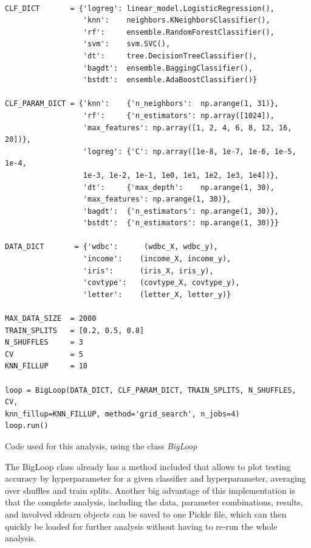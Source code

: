 \documentclass[twoside,11pt]{article}
\begin{document}
		\begin{listing}
		\begin{verbatim}

CLF_DICT       = {'logreg': linear_model.LogisticRegression(),
                  'knn':    neighbors.KNeighborsClassifier(),
                  'rf':     ensemble.RandomForestClassifier(),
                  'svm':    svm.SVC(),
                  'dt':     tree.DecisionTreeClassifier(),
                  'bagdt':  ensemble.BaggingClassifier(),
                  'bstdt':  ensemble.AdaBoostClassifier()}
                  
CLF_PARAM_DICT = {'knn':    {'n_neighbors':  np.arange(1, 31)},
                  'rf':     {'n_estimators': np.array([1024]),
                  'max_features': np.array([1, 2, 4, 6, 8, 12, 16, 20])},
                  'logreg': {'C': np.array([1e-8, 1e-7, 1e-6, 1e-5, 1e-4,
                  1e-3, 1e-2, 1e-1, 1e0, 1e1, 1e2, 1e3, 1e4])},
                  'dt':     {'max_depth':    np.arange(1, 30),
                  'max_features': np.arange(1, 30)},
                  'bagdt':  {'n_estimators': np.arange(1, 30)},
                  'bstdt':  {'n_estimators': np.arange(1, 30)}}

DATA_DICT       = {'wdbc':      (wdbc_X, wdbc_y),
                  'income':    (income_X, income_y),
                  'iris':      (iris_X, iris_y),
                  'covtype':   (covtype_X, covtype_y),
                  'letter':    (letter_X, letter_y)}

MAX_DATA_SIZE  = 2000
TRAIN_SPLITS   = [0.2, 0.5, 0.8]
N_SHUFFLES     = 3
CV             = 5
KNN_FILLUP     = 10

loop = BigLoop(DATA_DICT, CLF_PARAM_DICT, TRAIN_SPLITS, N_SHUFFLES, CV,
knn_fillup=KNN_FILLUP, method='grid_search', n_jobs=4)
loop.run()
		\end{verbatim}
		\caption{Code used for this analysis, using the class \textit{BigLoop}}
		\label{listing:code}
		\end{listing}
	
		The BigLoop class already has a method included that allows to plot testing accuracy by hyperparameter for a given classifier and hyperparameter, averaging over shuffles and train splits. Another big advantage of this implementation is that the complete analysis, including the data, parameter combinations, results, and involved sklearn objects can be saved to one Pickle file, which can then quickly be loaded for further analysis without having to re-run the whole analysis.
		
\end{document}
